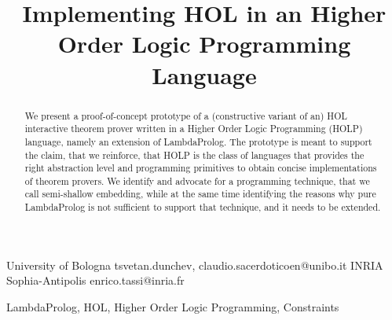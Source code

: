 \documentclass[preprint]{sigplanconf}
\begin{document}
\setlength{\pdfpageheight}{\paperheight}
\setlength{\pdfpagewidth}{\paperwidth}




\title{Implementing HOL in an Higher Order Logic Programming Language}

           {University of Bologna}
           {{tsvetan.dunchev, claudio.sacerdoticoen}@unibo.it}
           {INRIA Sophia-Antipolis}
           {enrico.tassi@inria.fr}

\maketitle

\begin{abstract}
We present a proof-of-concept prototype of a (constructive variant of an) HOL interactive theorem prover written in a Higher Order Logic Programming (HOLP) language, namely an extension of LambdaProlog. The prototype is meant to support the claim, that we reinforce, that HOLP is the class of languages that provides the right abstraction level and programming primitives to obtain concise implementations of theorem provers. We identify and advocate for a programming technique, that we call semi-shallow embedding, while at the same time identifying the reasons why pure LambdaProlog is not sufficient to support that technique, and it needs to be extended.
\end{abstract}



\keywords
LambdaProlog, HOL, Higher Order Logic Programming, Constraints
\end{document}
